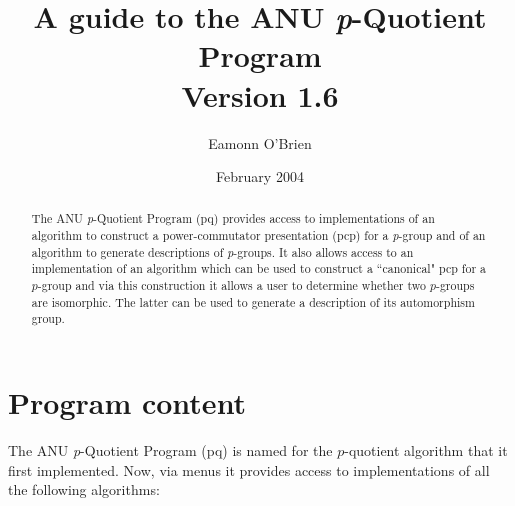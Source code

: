 \documentclass[12pt]{article}
\begin{document}
\title{A guide to the ANU {\it p}-Quotient Program\\Version 1.6}
\author{Eamonn O'Brien}
\date{February 2004}
\maketitle
\tableofcontents
\pagebreak

\begin{abstract}
The ANU {\it p}-Quotient Program (pq) provides access to implementations
of an algorithm to construct a power-commutator presentation (pcp) for 
a {\it p}-group and of an algorithm to generate descriptions of 
{\it p}-groups.  It also allows access to an implementation
of an algorithm which can be used to construct a ``canonical" 
pcp for a $p$-group and via this construction it allows a user 
to determine whether two $p$-groups are isomorphic. The latter
can be used to generate a description of its automorphism group.
\end{abstract}

\section{Program content}\label{sec:prog-content}
The ANU {\it p}-Quotient Program (pq) is named for the $p$-quotient algorithm
that it first implemented. Now, via menus it provides access to implementations
of all the following algorithms:
\end{document}
